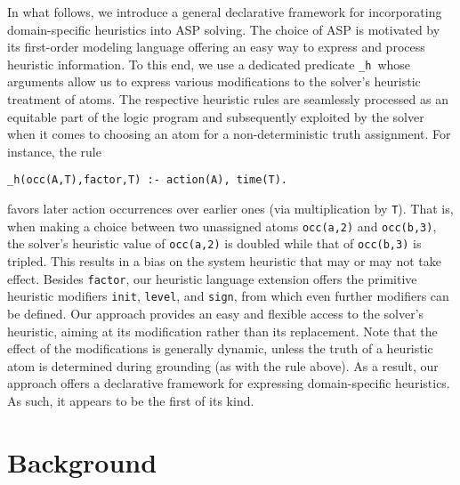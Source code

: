 \documentclass[letterpaper]{article}
\newcommand{\hpredicate}{\texttt{\_h}}
\begin{document}
In what follows,
we introduce a general declarative framework for incorporating domain-specific heuristics into ASP solving.
The choice of ASP is motivated by its first-order modeling language offering an easy way to express and process
heuristic information.
To this end,
we use a dedicated predicate \hpredicate\
whose arguments allow us to express various modifications to the solver's heuristic treatment of atoms.
The respective heuristic rules are seamlessly processed as an equitable part of the logic program
and subsequently exploited by the solver when it comes to choosing an atom for a non-deterministic 
truth assignment.
%
For instance, the rule
\begin{lstlisting}
_h(occ(A,T),factor,T) :- action(A), time(T).
\end{lstlisting}
favors later action occurrences over earlier ones (via multiplication by \texttt{T}).
That is, when making a choice between two unassigned atoms \texttt{occ(a,2)} and \texttt{occ(b,3)},
the solver's heuristic value of \texttt{occ(a,2)} is doubled while that of \texttt{occ(b,3)} is tripled.
This results in a bias on the system heuristic that may or may not take effect.
%
Besides \texttt{factor}, our heuristic language extension offers the primitive heuristic modifiers
\texttt{init}, \texttt{level}, and \texttt{sign}, from which even further modifiers can be defined.
Our approach provides an easy and flexible access to the solver's heuristic,
aiming at its modification rather than its replacement.
Note that the effect of the modifications is generally dynamic,
unless the truth of a heuristic atom is determined during grounding (as with the rule above).
As a result, our approach offers a declarative framework for expressing domain-specific heuristics.
As such, it appears to be the first of its kind.



\section{Background}\label{sec:background}
\end{document}
